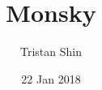 \documentclass[a4paper, 12pt]{article}
\title{Monsky}
\author{Tristan Shin}
\date{22 Jan 2018}
\begin{document}
\maketitle


\hrulefill

\begin{solution}
\end{solution}
\end{document}

